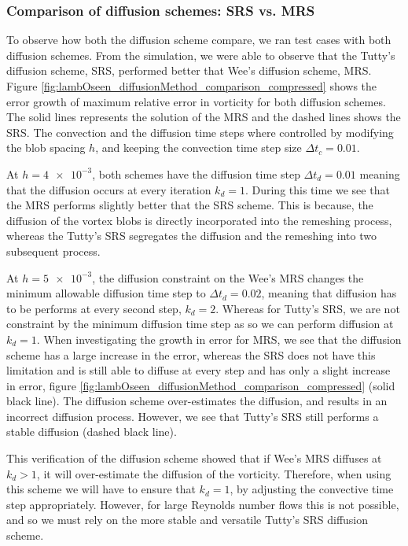 \subsubsection*{Comparison of diffusion schemes: SRS vs. MRS}

To observe how both the diffusion scheme compare, we ran test cases with both diffusion schemes. From the simulation, we were able to observe that the Tutty's diffusion scheme, SRS, performed better that Wee's diffusion scheme, MRS. Figure \ref{fig:lambOseen_diffusionMethod_comparison_compressed} shows the error growth of maximum relative error in vorticity for both diffusion schemes. The solid lines represents the solution of the MRS and the dashed lines shows the SRS. The convection and the diffusion time steps where controlled by modifying the blob spacing $h$, and keeping the convection time step size $\Delta t_c = 0.01$. 

At $h = \num{4e-3}$, both schemes have the diffusion time step $\Delta t_d = 0.01$ meaning that the diffusion occurs at every iteration $k_d = 1$. During this time we see that the MRS performs slightly better that the SRS scheme. This is because, the diffusion of the vortex blobs is directly incorporated into the remeshing process, whereas the Tutty's SRS segregates the diffusion and the remeshing into two subsequent process. 

At $h = \num{5e-3}$, the diffusion constraint on the Wee's MRS changes the minimum allowable diffusion time step to $\Delta t_d = 0.02$, meaning that diffusion has to be performs at every second step, $k_d=2$. Whereas for Tutty's SRS, we are not constraint by the minimum diffusion time step as so we can perform diffusion at $k_d = 1$. When investigating the growth in error for MRS, we see that the diffusion scheme has a large increase in the error, whereas the SRS does not have this limitation and is still able to diffuse at every step and has only a slight increase in error, figure \ref{fig:lambOseen_diffusionMethod_comparison_compressed} (solid black line). The diffusion scheme over-estimates the diffusion, and results in an incorrect diffusion process. However, we see that Tutty's SRS still performs a stable diffusion (dashed black line).

This verification of the diffusion scheme showed that if Wee's MRS diffuses at $k_d > 1$, it will over-estimate the diffusion of the vorticity. Therefore, when using this scheme we will have to ensure that $k_d = 1$, by adjusting the convective time step appropriately. However, for large Reynolds number flows this is not possible, and so we must rely on the more stable and versatile Tutty's SRS diffusion scheme.

